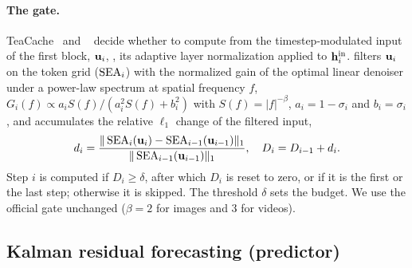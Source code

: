 \paragraph{The \sea gate.}
TeaCache~\cite{liu2025teacache} and \seacache~\cite{chung2026seacache} decide whether to compute from the
timestep-modulated input of the first block, $\mathbf{u}_i$, \ie, its adaptive layer normalization applied to $\mathbf{h}^{\mathrm{in}}_i$.
\seacache filters $\mathbf{u}_i$ on the token grid ($\operatorname{SEA}_i$) with the normalized gain of the optimal linear denoiser under a
power-law spectrum at spatial frequency $f$, $G_i(f)\propto a_iS(f)/(a_i^2S(f)+b_i^2)$ with $S(f)=|f|^{-\beta}$, $a_i=1-\sigma_i$ and
$b_i=\sigma_i$, and accumulates the relative $\ell_1$ change of the filtered input,
\begin{equation}
  d_i=\frac{\|\operatorname{SEA}_i(\mathbf{u}_i)-\operatorname{SEA}_{i-1}(\mathbf{u}_{i-1})\|_1}{\|\operatorname{SEA}_{i-1}(\mathbf{u}_{i-1})\|_1},
  \quad D_i=D_{i-1}+d_i.
  \label{eq:sea}
\end{equation}
Step $i$ is computed if $D_i\ge\delta$, after which $D_i$ is reset to zero, or if it is the first or the last step;
otherwise it is skipped. The threshold $\delta$ sets the budget. We use the official gate unchanged ($\beta=2$ for
images and 3 for videos).

\subsection{Kalman residual forecasting (predictor)}
\label{sec:kalman}

